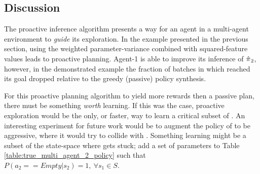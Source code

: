 \begin{figure}[htb]
    \begin{center}
    \end{center}
\end{figure}

\subsection{Discussion}

The proactive inference algorithm presents a way for an agent in a multi-agent environment to \emph{guide} its
exploration. In the example presented in  the previous section, using the weighted parameter-variance combined with
squared-feature values leads to proactive planning. Agent-1 is able to improve its inference of
$\hat{\pi_{}}_2$, however, in the demonstrated example the fraction of batches in which  reached its
goal dropped relative to the greedy (passive) policy synthesis.

For this proactive planning algorithm to yield more rewards then a passive plan, there must be something \emph{worth}
learning. If this was the case, proactive exploration would be the only, or faster, way to learn a critical subset of
. An interesting experiment for future work would be to augment the policy of  to be aggressive,
where it would try to collide with . Something  learning might be a subset of the
state-space where  gets stuck; add a set of parameters to Table \ref{table:true_multi_agent_2_policy} such that
$P(a_2 == Empty|s_2)=1,\ \forall s_1 \in S$.

